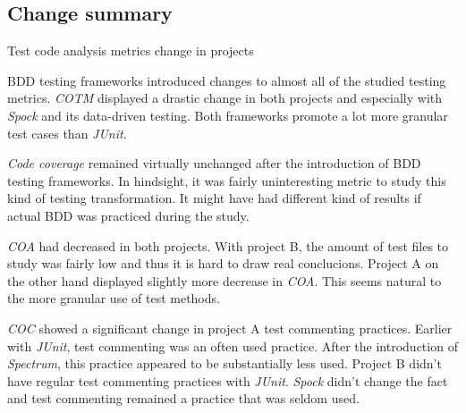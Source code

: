 \subsection{Change summary}

{\renewcommand{\arraystretch}{1.3}
\begin{table}[H]
        \caption {Test code analysis metrics change in projects} \label{tab:test-change}
        \caption*{+ = Increase amount, - = Decrease amount}
\end{table}
}

BDD testing frameworks introduced changes to almost all of the studied testing metrics. \textit{COTM} displayed a drastic change
in both projects and especially with \textit{Spock} and its data-driven testing. Both frameworks promote a lot more granular
test cases than \textit{JUnit}.

\textit{Code coverage} remained virtually unchanged after the introduction of BDD testing frameworks. In
hindsight, it was fairly uninteresting metric to study this kind of testing transformation. It might have had different
kind of results if actual BDD was practiced during the study.

\textit{COA} had decreased in both projects. With project B, the amount of test files to study was fairly low and thus it is
hard to draw real conclucions. Project A on the other hand displayed slightly more decrease in \textit{COA}. This seems natural
to the more granular use of test methods.

\textit{COC} showed a significant change in project A test commenting practices. Earlier with \textit{JUnit}, test commenting was an often
used practice. After the introduction of \textit{Spectrum}, this practice appeared to be substantially less used. Project B didn't
have regular test commenting practices with \textit{JUnit}. \textit{Spock} didn't change the fact and test commenting remained a practice
that was seldom used.

